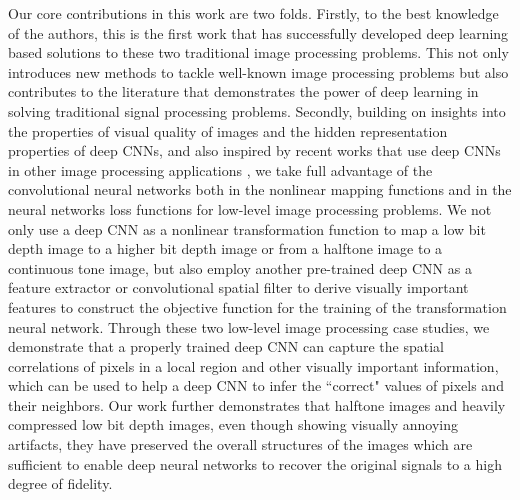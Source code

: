 \documentclass[journal]{IEEEtran}
\begin{document}
Our core contributions in this work are two folds. Firstly, to the best knowledge of the authors, this is the first work that has successfully developed deep learning based solutions to these two traditional image processing problems. This not only introduces new methods to tackle well-known image processing problems but also contributes to the literature that demonstrates the power of deep learning in solving traditional signal processing problems. Secondly, building on insights into the properties of visual quality of images and the hidden representation properties of deep CNNs, and also inspired by recent works that use deep CNNs in other image processing applications \cite{gatys2015neural,johnson2016perceptual,hou2017deep}, we take full advantage of the convolutional neural networks both in the nonlinear mapping functions and in the neural networks loss functions for low-level image processing problems. We not only use a deep CNN as a nonlinear transformation function to map a low bit depth image to a higher bit depth image or from a halftone image to a continuous tone image, but also employ another pre-trained deep CNN as a feature extractor or convolutional spatial filter to derive visually important features to construct the objective function for the training of the transformation neural network. Through these two low-level image processing case studies, we demonstrate that a properly trained deep CNN can capture the spatial correlations of pixels in a local region and other visually important information, which can be used to help a deep CNN to infer  the ``correct" values of pixels and their neighbors. Our work further demonstrates that halftone images and heavily compressed low bit depth images, even though showing visually annoying artifacts, they have preserved the overall structures of the images which are sufficient to enable deep neural networks to recover the original signals to a high degree of fidelity. %
\end{document}
